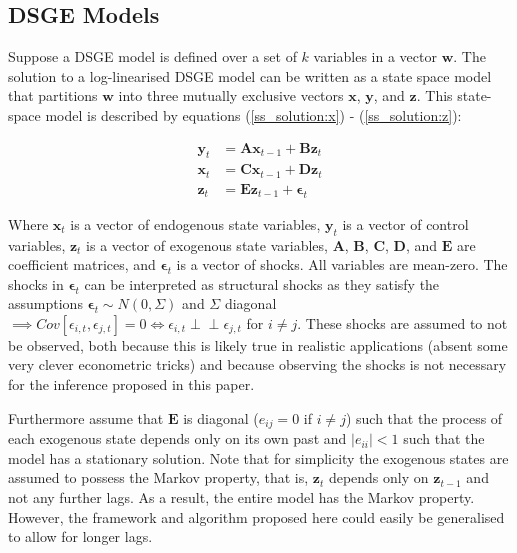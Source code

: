 \documentclass{article}
\def\indep{\perp \!\!\! \perp}
\begin{document}
\subsection{DSGE Models} \label{dsge}

Suppose a DSGE model is defined over a set of $k$ variables in a vector $\mathbf{w}$. The solution to a log-linearised DSGE model can be written as a state space model \parencite{king1988production} that partitions $\mathbf{w}$ into three mutually exclusive vectors $\mathbf{x}$, $\mathbf{y}$, and $\mathbf{z}$. This state-space model is described by equations (\ref{ss_solution:x}) - (\ref{ss_solution:z}):

\begin{align}
  \mathbf{y}_t &= \mathbf{A} \mathbf{x}_{t-1} + \mathbf{B} \mathbf{z}_{t} \label{ss_solution:x}\\
  \mathbf{x}_t &= \mathbf{C} \mathbf{x}_{t-1} + \mathbf{D} \mathbf{z}_{t} \label{ss_solution:y}\\
  \mathbf{z}_t &= \mathbf{E} \mathbf{z}_{t-1} + \mathbf{\epsilon}_{t} \label{ss_solution:z}
\end{align}

Where $\mathbf{x}_t$ is a vector of endogenous state variables, $\mathbf{y}_t$ is a vector of control variables, $\mathbf{z}_t$ is a vector of exogenous state variables, $\mathbf{A}$, $\mathbf{B}$, $\mathbf{C}$, $\mathbf{D}$, and $\mathbf{E}$ are coefficient matrices, and $\mathbf{\epsilon}_t$ is a vector of shocks. All variables are mean-zero. The shocks in $\mathbf{\epsilon}_t$ can be interpreted as structural shocks as they satisfy the assumptions $\mathbf{\epsilon}_{t} \sim N(0,\Sigma)$ and $\Sigma$ diagonal $\implies Cov[\epsilon_{i,t},\epsilon_{j,t}] = 0 \iff \epsilon_{i,t} \indep \epsilon_{j,t} $ for $i \not = j$. These shocks are assumed to not be observed, both because this is likely true in realistic applications (absent some very clever econometric tricks) and because observing the shocks is not necessary for the inference proposed in this paper.

Furthermore assume that $\mathbf{E}$ is diagonal ($e_{ij} = 0$ if $i \not = j$) such that the process of each exogenous state depends only on its own past and $|e_{ii}| < 1$ such that the model has a stationary solution. Note that for simplicity the exogenous states are assumed to possess the Markov property, that is, $\mathbf{z}_t$ depends only on $\mathbf{z}_{t-1}$ and not any further lags. As a result, the entire model has the Markov property. However, the framework and algorithm proposed here could easily be generalised to allow for longer lags.
\end{document}
